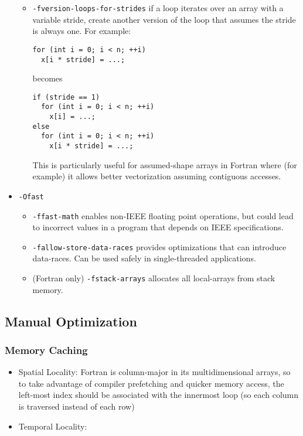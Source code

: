 \documentclass{article}
\begin{document}
\begin{itemize}
\begin{itemize}
                    \item \verb|-fversion-loops-for-strides| if a loop iterates over an array with a variable stride, create another version of the loop that assumes the stride is always one. For example: 
                    \begin{verbatim}
for (int i = 0; i < n; ++i)
  x[i * stride] = ...;
                    \end{verbatim}
                    becomes
                    \begin{verbatim}
if (stride == 1)
  for (int i = 0; i < n; ++i)
    x[i] = ...;
else
  for (int i = 0; i < n; ++i)
    x[i * stride] = ...;
                    \end{verbatim}
                    This is particularly useful for assumed-shape arrays in Fortran where (for example) it allows better vectorization assuming contiguous accesses.
                \end{itemize}
            \item \verb|-Ofast|
                \begin{itemize}
                    \item \verb|-ffast-math| enables non-IEEE floating point operations, but could lead to incorrect values in a program that depends on IEEE specifications.
                    \item \verb|-fallow-store-data-races| provides optimizations that can introduce data-races.  Can be used safely in single-threaded applications.
                    \item (Fortran only) \verb|-fstack-arrays| allocates all local-arrays from stack memory.
                \end{itemize}
        \end{itemize}

    \subsection{Manual Optimization}

        \subsubsection{Memory Caching}

            \begin{itemize}
                \item Spatial Locality: Fortran is column-major in its multidimensional arrays, so to take advantage of compiler prefetching and quicker memory access, the left-most index should be associated with the innermost loop (so each column is traversed instead of each row)
                \item Temporal Locality: 
            \end{itemize}
\end{document}
